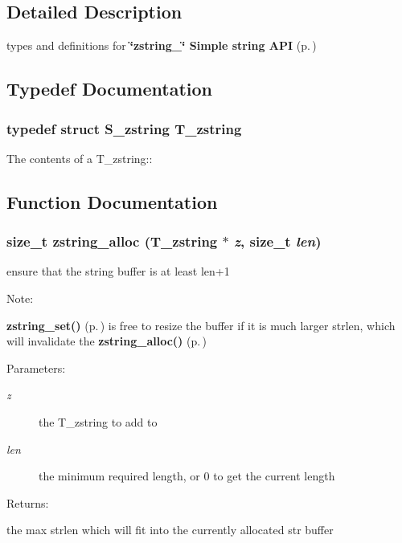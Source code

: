 \subsection{Detailed Description}
types and definitions for {\bf \char`\"{}zstring\_\-\char`\"{} Simple string API} {\rm (p.\,\pageref{group__zstring})}





\subsection{Typedef Documentation}
\subsubsection{\setlength{\rightskip}{0pt plus 5cm}typedef struct {\bf S\_\-zstring}  T\_\-zstring}\label{zstring_8h_a0}


The contents of a T\_\-zstring:: 

\subsection{Function Documentation}
\subsubsection{\setlength{\rightskip}{0pt plus 5cm}size\_\-t zstring\_\-alloc ({\bf T\_\-zstring} $\ast$ {\em z}, size\_\-t {\em len})}\label{zstring_8h_a6}


ensure that the string buffer is at least len+1  \begin{Desc}
\item[Note: ]\par
{\bf zstring\_\-set()} {\rm (p.\,\pageref{zstring_8h_a3})} is free to resize the buffer if  it is much larger strlen, which will invalidate the {\bf zstring\_\-alloc()} {\rm (p.\,\pageref{zstring_8h_a6})} \end{Desc}
\begin{Desc}
\item[Parameters: ]\par
\begin{description}
\item[{\em 
z}]the T\_\-zstring to add to \item[{\em 
len}]the minimum required length, or 0 to get the current length \end{description}
\end{Desc}
\begin{Desc}
\item[Returns: ]\par
the max strlen which will fit into the currently allocated str buffer \end{Desc}
